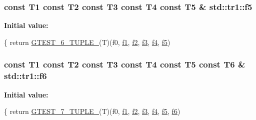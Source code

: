 \subsubsection[{\texorpdfstring{f5}{f5}}]{\setlength{\rightskip}{0pt plus 5cm}const T1 const T2 const T3 const T4 const T5 \& std\+::tr1\+::f5}\hypertarget{namespacestd_1_1tr1_a9c1eb66b2b2fa321942af95405232a0d}{}\label{namespacestd_1_1tr1_a9c1eb66b2b2fa321942af95405232a0d}
{\bfseries Initial value\+:}
\begin{DoxyCode}
\{
  \textcolor{keywordflow}{return} \hyperlink{gtest-tuple_8h_a53f36c86a979ed8285bf3c6f82f16483}{GTEST\_6\_TUPLE\_}(T)(f0, \hyperlink{namespacestd_1_1tr1_a9c0fa65b105f8e2f58ba59ecf75fd000}{f1}, \hyperlink{namespacestd_1_1tr1_a87dd9e009868361317f587126dba63d4}{f2}, \hyperlink{namespacestd_1_1tr1_a0f7c3b47d27d42d82d1a333ea420ce4e}{f3}, \hyperlink{namespacestd_1_1tr1_adc796e02b7385d526aff708189564f67}{f4}, \hyperlink{namespacestd_1_1tr1_a9c1eb66b2b2fa321942af95405232a0d}{f5})
\end{DoxyCode}
\subsubsection[{\texorpdfstring{f6}{f6}}]{\setlength{\rightskip}{0pt plus 5cm}const T1 const T2 const T3 const T4 const T5 const T6 \& std\+::tr1\+::f6}\hypertarget{namespacestd_1_1tr1_a6b62f32e1e3e21bceb94eb46c4cbfd56}{}\label{namespacestd_1_1tr1_a6b62f32e1e3e21bceb94eb46c4cbfd56}
{\bfseries Initial value\+:}
\begin{DoxyCode}
\{
  \textcolor{keywordflow}{return} \hyperlink{gtest-tuple_8h_a8987baf82ee028d1d778447413a02c0c}{GTEST\_7\_TUPLE\_}(T)(f0, \hyperlink{namespacestd_1_1tr1_a9c0fa65b105f8e2f58ba59ecf75fd000}{f1}, \hyperlink{namespacestd_1_1tr1_a87dd9e009868361317f587126dba63d4}{f2}, \hyperlink{namespacestd_1_1tr1_a0f7c3b47d27d42d82d1a333ea420ce4e}{f3}, \hyperlink{namespacestd_1_1tr1_adc796e02b7385d526aff708189564f67}{f4}, \hyperlink{namespacestd_1_1tr1_a9c1eb66b2b2fa321942af95405232a0d}{f5}, \hyperlink{namespacestd_1_1tr1_a6b62f32e1e3e21bceb94eb46c4cbfd56}{f6})
\end{DoxyCode}
